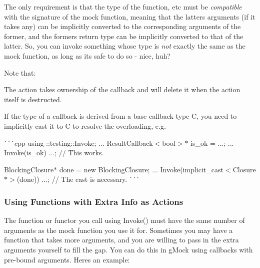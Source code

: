 The only requirement is that the type of the function, etc must be {\itshape compatible} with the signature of the mock function, meaning that the latter\textquotesingle{}s arguments (if it takes any) can be implicitly converted to the corresponding arguments of the former, and the former\textquotesingle{}s return type can be implicitly converted to that of the latter. So, you can invoke something whose type is {\itshape not} exactly the same as the mock function, as long as it\textquotesingle{}s safe to do so -\/ nice, huh?

Note that\+:


\begin{DoxyItemize}
\item The action takes ownership of the callback and will delete it when the action itself is destructed.
\item If the type of a callback is derived from a base callback type {\ttfamily C}, you need to implicitly cast it to {\ttfamily C} to resolve the overloading, e.\+g.

\`{}\`{}\`{}cpp using \+::testing\+::\+Invoke; ... Result\+Callback$<$bool$>$$\ast$ is\+\_\+ok = ...; ... Invoke(is\+\_\+ok) ...; // This works.

Blocking\+Closure$\ast$ done = new Blocking\+Closure; ... Invoke(implicit\+\_\+cast$<$\+Closure$\ast$$>$(done)) ...; // The cast is necessary. \`{}\`{}\`{}
\end{DoxyItemize}

\subsubsection*{Using Functions with Extra Info as Actions}

The function or functor you call using {\ttfamily Invoke()} must have the same number of arguments as the mock function you use it for. Sometimes you may have a function that takes more arguments, and you are willing to pass in the extra arguments yourself to fill the gap. You can do this in g\+Mock using callbacks with pre-\/bound arguments. Here\textquotesingle{}s an example\+:


